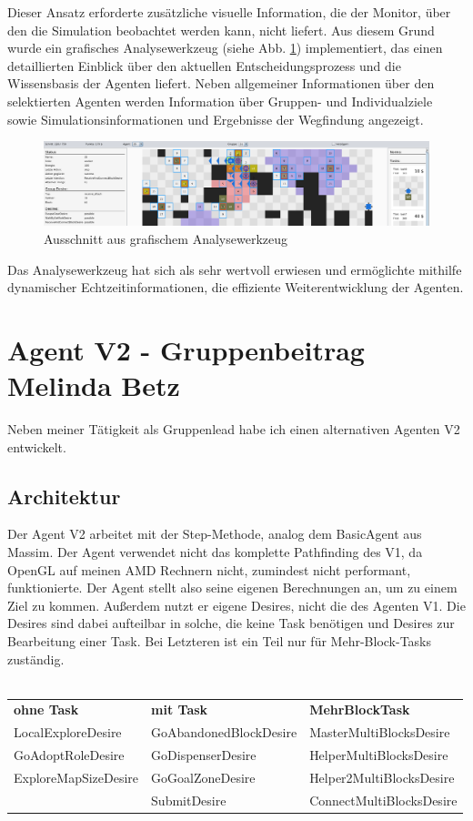 \documentclass[runningheads]{llncs}
\begin{document}
	Dieser Ansatz erforderte zusätzliche visuelle Information, die der Monitor, über den die Simulation beobachtet werden kann, nicht liefert. Aus diesem Grund wurde ein grafisches Analysewerkzeug (siehe Abb. \ref{debugger}) implementiert, das einen detaillierten Einblick über den aktuellen Entscheidungsprozess und die Wissensbasis der Agenten liefert. Neben allgemeiner Informationen über den selektierten Agenten werden Information über Gruppen- und Individualziele sowie Simulationsinformationen und Ergebnisse der Wegfindung angezeigt.
	
	
	\begin{figure}
		\vspace{-3mm}
		\includegraphics[scale=0.091]{./Referenzen/Debugger3.png}
		\caption{Ausschnitt aus grafischem Analysewerkzeug}
		\label{debugger}
		\vspace{-3mm}
	\end{figure}
	
	Das Analysewerkzeug hat sich als sehr wertvoll erwiesen und ermöglichte mithilfe dynamischer Echtzeitinformationen, die effiziente Weiterentwicklung der Agenten.
	
	
	\section{Agent V2 - Gruppenbeitrag Melinda Betz}\label{agentV2}
	Neben meiner Tätigkeit als Gruppenlead habe ich einen alternativen Agenten V2 entwickelt.
	
	\subsection{ Architektur}
	Der Agent V2 arbeitet mit der Step-Methode, analog dem BasicAgent aus Massim. 
	Der Agent verwendet nicht das komplette Pathfinding des V1, da OpenGL auf meinen AMD Rechnern nicht, zumindest nicht performant, funktionierte. Der Agent stellt also seine eigenen Berechnungen an, um zu einem Ziel zu kommen. Außerdem nutzt er eigene Desires, nicht die des Agenten V1. Die Desires sind dabei aufteilbar in solche, die keine Task benötigen und Desires zur Bearbeitung einer Task. Bei Letzteren ist ein Teil nur für Mehr-Block-Tasks zuständig.
	\\
	\\
	\begin{tabular}{lll}
	\textbf{ohne Task} & \textbf{mit Task} & \textbf{Mehr\-Block\-Task}\\
	LocalExploreDesire & GoAbandonedBlockDesire & MasterMultiBlocksDesire\\
	GoAdoptRoleDesire & GoDispenserDesire & HelperMultiBlocksDesire\\
	ExploreMapSizeDesire & GoGoalZoneDesire & Helper2MultiBlocksDesire\\
	& SubmitDesire & ConnectMultiBlocksDesire\\
	\end{tabular}
	
\end{document}

